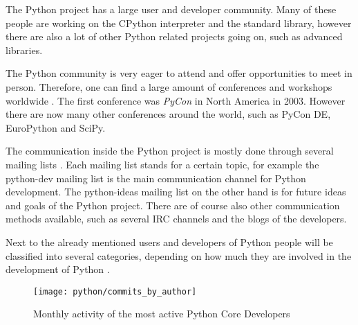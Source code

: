 The Python project has a large user and developer community. Many of these people are
working on the CPython interpreter and the standard library, however there are
also a lot of other Python related projects going on, such as advanced libraries.

The Python community is very eager to attend and offer opportunities to meet in
person. Therefore, one can find a large amount of conferences and workshops
worldwide \cite{PythonConferences}. The first conference was \emph{PyCon} in
North America in 2003. However there are now many other conferences around the
world, such as PyCon DE, EuroPython and SciPy.

The communication inside the Python project is mostly done through several
mailing lists \cite{PythonCommunication}. Each mailing list stands for a
certain topic, for example the python-dev mailing list is the main
communication channel for Python development. The python-ideas mailing list on
the other hand is for future ideas and goals of the Python project. There are
of course also other communication methods available, such as several \ac{IRC}
channels and the blogs of the developers.

Next to the already mentioned users and developers of Python people will be
classified into several categories, depending on how much they are involved in
the development of Python \cite{PythonCoreDeveloper}.

\begin{figure}[htbp]
  \centering
  \texttt{[image: python/commits\_by\_author]}
  \caption{Monthly activity of the most active Python Core Developers}
\end{figure}

